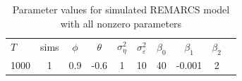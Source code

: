 \begin{table}[H]
\centering\begin{tabular}{lccccccccc}
\hline
$T$ & sims & $\phi$ & $\theta$ & $\sigma_\eta^2$ & $\sigma_\varepsilon^2$ & $\beta_0$ & $\beta_1$ & $\beta_2$ \\
1000 & 1 & 0.9 & -0.6 & 1 & 10 & 40 & -0.001 & 2 \\
\hline
\end{tabular}
\caption{Parameter values for simulated REMARCS model with all nonzero parameters}
\label{tab:param_estimates}
\end{table}

